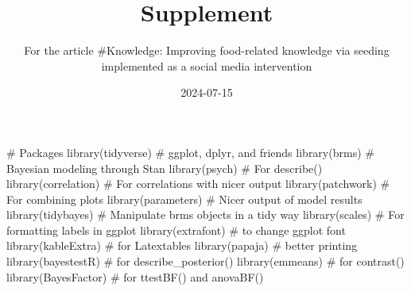 \documentclass[
  letterpaper,
  DIV=11,
  numbers=noendperiod]{scrartcl}
\title{Supplement}
\subtitle{For the article \#Knowledge: Improving food-related knowledge
via seeding implemented as a social media intervention}
\author{}
\date{2024-07-15}
\newenvironment{Shaded}{\begin{snugshade}}{\end{snugshade}}
\newcommand{\CommentTok}[1]{\textcolor[rgb]{0.37,0.37,0.37}{#1}}
\newcommand{\FunctionTok}[1]{\textcolor[rgb]{0.28,0.35,0.67}{#1}}
\newcommand{\NormalTok}[1]{\textcolor[rgb]{0.00,0.23,0.31}{#1}}
\begin{document}
\maketitle

\begin{Shaded}
\begin{Highlighting}[]
\CommentTok{\# Packages}
\FunctionTok{library}\NormalTok{(tidyverse)   }\CommentTok{\# ggplot, dplyr, and friends}
\FunctionTok{library}\NormalTok{(brms)        }\CommentTok{\# Bayesian modeling through Stan}
\FunctionTok{library}\NormalTok{(psych)       }\CommentTok{\# For describe()}
\FunctionTok{library}\NormalTok{(correlation) }\CommentTok{\# For correlations with nicer output}
\FunctionTok{library}\NormalTok{(patchwork)   }\CommentTok{\# For combining plots}
\FunctionTok{library}\NormalTok{(parameters)  }\CommentTok{\# Nicer output of model results}
\FunctionTok{library}\NormalTok{(tidybayes)   }\CommentTok{\# Manipulate brms objects in a tidy way}
\FunctionTok{library}\NormalTok{(scales)      }\CommentTok{\# For formatting labels in ggplot}
\FunctionTok{library}\NormalTok{(extrafont)   }\CommentTok{\# to change ggplot font}
\FunctionTok{library}\NormalTok{(kableExtra)  }\CommentTok{\# for Latextables}
\FunctionTok{library}\NormalTok{(papaja)      }\CommentTok{\# better printing }
\FunctionTok{library}\NormalTok{(bayestestR)  }\CommentTok{\# for describe\_posterior() }
\FunctionTok{library}\NormalTok{(emmeans)     }\CommentTok{\# for contrast()}
\FunctionTok{library}\NormalTok{(BayesFactor) }\CommentTok{\# for ttestBF() and anovaBF()}
\end{Highlighting}
\end{Shaded}
\end{document}
